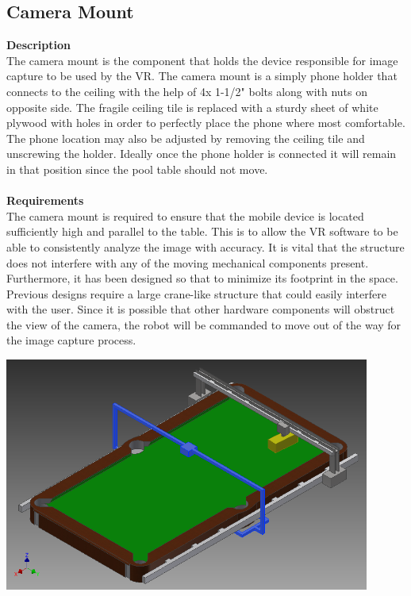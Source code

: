 \documentclass[titlepage]{article}
\begin{document}
\newpage
\subsection{Camera Mount}
\textbf{Description}\\
The camera mount is the component that holds the device responsible for image capture to be used by the VR. The camera mount is a simply phone holder that connects to the ceiling with the help of 4x 1-1/2" bolts along with nuts on opposite side. The fragile ceiling tile is replaced with a sturdy sheet of white plywood with holes in order to perfectly place the phone where most comfortable. The phone location may also be adjusted by removing the ceiling tile and unscrewing the holder. Ideally once the phone holder is connected it will remain in that position since the pool table should not move.\\~\\
\textbf{Requirements}\\
The camera mount is required to ensure that the mobile device is located sufficiently high and parallel to the table. This is to allow the VR software to be able to consistently analyze the image with accuracy. It is vital that the structure does not interfere with any of the moving mechanical components present. Furthermore, it has been designed so that to minimize its footprint in the space. Previous designs require a large crane-like structure that could easily interfere with the user. Since it is possible that other hardware components will obstruct the view of the camera, the robot will be commanded to move out of the way for the image capture process.
\begin{center}
	\includegraphics[width = 0.9\textwidth]{cameraMountYAxis.png}
\label{fig:cameraMount}
\end{center}
\end{document}
